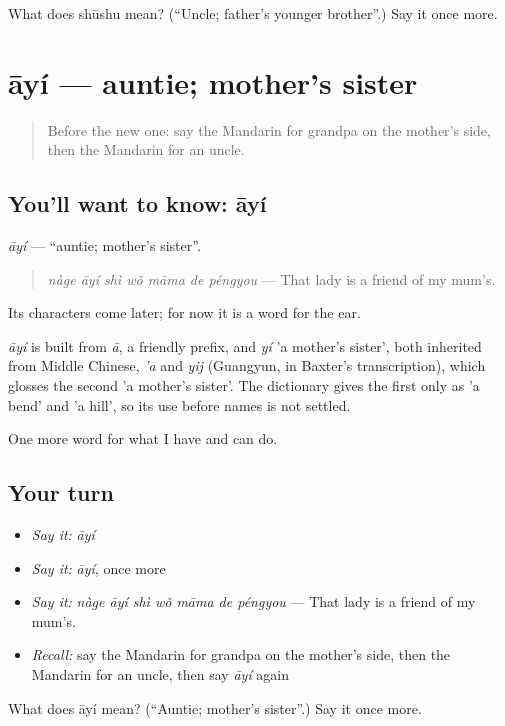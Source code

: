 \begin{tcolorbox}[breakable,colback=teal!4,colframe=teal!35!black,title={Before you move on}]
What does shūshu mean? (\textquotedblleft{}Uncle; father's younger brother\textquotedblright{}.) Say it once more.
\end{tcolorbox}
\section[āyí]{āyí — auntie; mother's sister}

\label{lesson:ZH-C272-ayi}



\begin{quote}
Before the new one: say the Mandarin for grandpa on the mother's side, then the Mandarin for an uncle.
\end{quote}

\subsection*{You'll want to know: āyí}
\emph{āyí} — \textquotedblleft{}auntie; mother's sister\textquotedblright{}.

\begin{quote}
\emph{nàge āyí shì wǒ māma de péngyou} — That lady is a friend of my mum's.
\end{quote}

Its characters come later; for now it is a word for the ear.

\begin{cousinweb}
\emph{āyí} is built from \emph{ā}, a friendly prefix, and \emph{yí} 'a mother's sister', both inherited from Middle Chinese, \emph{'a} and \emph{yij} (Guangyun, in Baxter's transcription), which glosses the second 'a mother's sister'. The dictionary gives the first only as 'a bend' and 'a hill', so its use before names is not settled.
\end{cousinweb}

\begin{grammarlens}[title={What you've built}]
One more word for what I have and can do.
\end{grammarlens}

\subsection*{Your turn}
\begin{itemize}
\raggedright
  \item \emph{Say it:} \emph{āyí}
  \item \emph{Say it:} \emph{āyí}, once more
  \item \emph{Say it:} \emph{nàge āyí shì wǒ māma de péngyou} — That lady is a friend of my mum's.
  \item \emph{Recall:} say the Mandarin for grandpa on the mother's side, then the Mandarin for an uncle, then say \emph{āyí} again
\end{itemize}

\begin{tcolorbox}[breakable,colback=teal!4,colframe=teal!35!black,title={Before you move on}]
What does āyí mean? (\textquotedblleft{}Auntie; mother's sister\textquotedblright{}.) Say it once more.
\end{tcolorbox}
